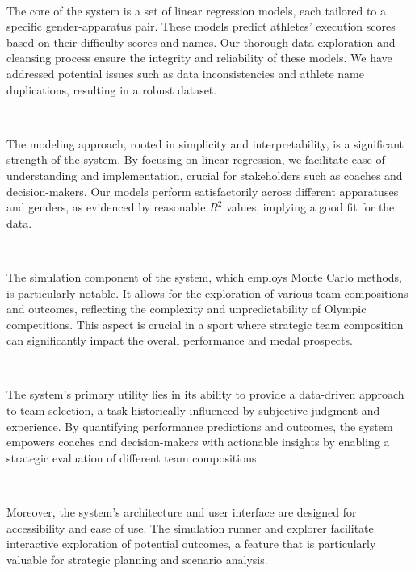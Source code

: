\documentclass{article}
\begin{document}
\

\noindent The core of the system is a set of linear regression models, each tailored 
to a specific gender-apparatus pair. These models predict athletes' execution 
scores based on their difficulty scores and names. Our thorough data exploration 
and cleansing process ensure the integrity and reliability of these models. 
We have addressed potential issues such as data inconsistencies and athlete 
name duplications, resulting in a robust dataset. 

\

\noindent The modeling approach, rooted in simplicity and interpretability, is a significant 
strength of the system. By focusing on linear regression, we facilitate ease of 
understanding and implementation, crucial for stakeholders such as coaches and decision-makers. 
Our models perform satisfactorily across different apparatuses and genders, as evidenced by reasonable 
$R^2$ values, implying a good fit for the data.

\

\noindent The simulation component of the system, which employs Monte Carlo 
methods, is particularly notable. It allows for the exploration of various team 
compositions and outcomes, reflecting the complexity and unpredictability of 
Olympic competitions. This aspect is crucial in a sport where strategic team 
composition can significantly impact the overall performance and medal prospects.

\

\noindent The system's primary utility lies in its ability to provide a data-driven 
approach to team selection, a task historically influenced by subjective judgment and experience. 
By quantifying performance predictions and outcomes, the system empowers coaches and 
decision-makers with actionable insights by enabling a strategic evaluation of different team compositions.

\

\noindent Moreover, the system's architecture and user interface are designed 
for accessibility and ease of use. The simulation runner and explorer facilitate 
interactive exploration of potential outcomes, a feature that is particularly valuable 
for strategic planning and scenario analysis.
\end{document}
